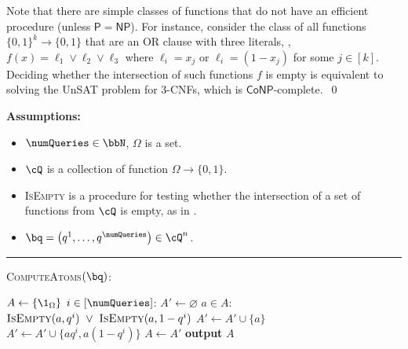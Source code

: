 \documentclass{toc}
\begin{document}
\begin{remark}
	Note that there are simple classes of functions that do not have an efficient procedure {} (unless $\mathsf{P} = \mathsf{NP}$). For instance, consider the class of all functions $\{0,1\}^k \to \{0,1\}$ that are an OR clause with three literals, \ie, $f(x) = \ell_1 \vee \ell_2 \vee \ell_3$ where $\ell_i = x_j$ or $\ell_i = (1-x_j)$ for some $j \in [k]$. Deciding whether the intersection of such functions $f$ is empty is equivalent to solving the UnSAT problem for $3$-CNFs, which is $\mathsf{CoNP}$-complete.~\qed
\end{remark}

\begin{algorithmFloat}[H]
	\begin{ShadedAlgorithmBox}
		{\bfseries Assumptions:} 
		\begin{itemize}
			\item{
				$\numQueries \in \bbN$, $\Omega$ is a set.
			}
			\item{
				$\cQ$ is a collection of function $\Omega \to \{0,1\}$.
			}
			\item{
				\textsc{IsEmpty} is a procedure for testing whether the intersection of a set of functions from $\cQ$ is empty, as in .
			}
			\item{
				$\bq = \left(q^1,\dots,q^{\numQueries}\right) \in \cQ^n$.
			}
		\end{itemize}
		
		\noindent\rule{\textwidth}{0.5pt}
		
		\vspace*{0.5em}
		
		\textsc{ComputeAtoms}$(\bq)$:
		\begin{algorithmic}
			\vsp
			\State $A \gets \{\1_\Omega\}$
			\vsp
			\For $i \in [\numQueries]$:
				\State $A' \gets \varnothing$
				\For $a \in A$:
					\If $%
							\textsc{IsEmpty}(a,q^i)
						~ \lor ~ 
							\textsc{IsEmpty}(a,1-q^i)
						$
						\State $A' \gets A' \cup \{a\}$
					\Else
						\State $A' \gets A' \cup \{aq^i,a(1-q^i)\}$
					\EndIf
				\EndFor
				\State $A \gets A'$
			\EndFor
			\vsp
			\State \textbf{output} $A$
		\end{algorithmic}
	\end{ShadedAlgorithmBox}
	
	\caption{An algorithm for computing the atoms of a set of statistical queries.}

	\label{algorithm:compute-atoms}
\end{algorithmFloat}
\end{document}
